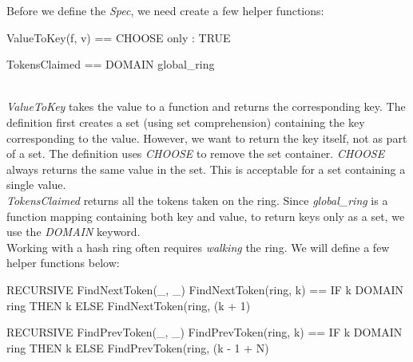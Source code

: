 Before we define the \textit{Spec}, we need create a few helper functions:\\
\begin{tla}
ValueToKey(f, v) == 
    CHOOSE only : TRUE

TokensClaimed == 
    DOMAIN global_ring
\end{tla}
\begin{tlatex}
%
\@pvspace{8.0pt}%
%
%
\end{tlatex}
\\

\textit{ValueToKey} takes the value to a function and returns the corresponding
key. The definition first creates a set (using set comprehension) containing the
key corresponding to the value. However, we want to return the key itself,
not as part of a set. The definition uses \textit{CHOOSE} to remove the set
container. \textit{CHOOSE} always returns the same value in the set. This is
acceptable for a set containing a single value.\\

\textit{TokensClaimed} returns all the tokens taken on the ring. Since
\textit{global\_ring} is a function mapping containing both key and value, to
return keys only as a set, we use the \textit{DOMAIN} keyword.\\

Working with a hash ring often requires \textit{walking} the ring. We will
define a few helper functions below:\\

\begin{tla}
RECURSIVE FindNextToken(_, _)
FindNextToken(ring, k) ==
    IF k \in DOMAIN ring THEN
        k 
    ELSE 
        FindNextToken(ring, (k + 1) %

RECURSIVE FindPrevToken(_, _)
FindPrevToken(ring, k) ==
    IF k \in DOMAIN ring THEN
        k
    ELSE 
        FindPrevToken(ring, (k - 1 + N) %
\end{tla}
\begin{tlatex}
%
%
%
%
%
%
\@pvspace{8.0pt}%
%
%
%
%
%
%
\end{tlatex}
\\

